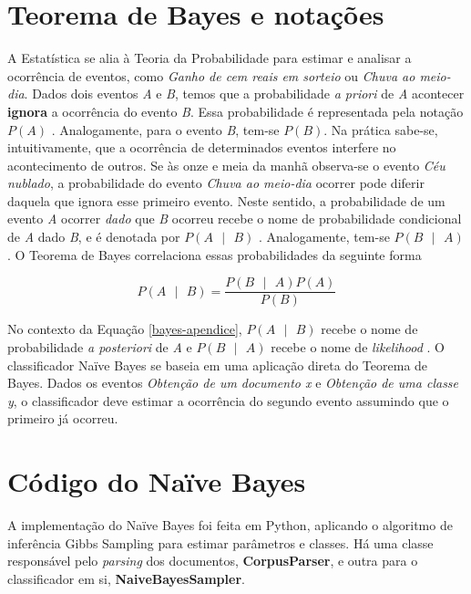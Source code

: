 \appendix

\chapter{Teorema de Bayes e notações}

A Estatística se alia à Teoria da Probabilidade para estimar e analisar a ocorrência de eventos, como \emph{Ganho de cem reais em sorteio} ou \emph{Chuva ao meio-dia}. Dados dois eventos \emph{A} e \emph{B}, temos que a probabilidade \emph{a priori} de \emph{A} acontecer \textbf{ignora} a ocorrência do evento \emph{B}. Essa probabilidade é representada pela notação \ensuremath{P(A)} \cite{spiegelhalter}. Analogamente, para o evento \emph{B}, tem-se \ensuremath{P(B)}. Na prática sabe-se, intuitivamente, que a ocorrência de determinados eventos interfere no acontecimento de outros. Se às onze e meia da manhã observa-se o evento \emph{Céu nublado}, a probabilidade do evento \emph{Chuva ao meio-dia} ocorrer pode diferir daquela que ignora esse primeiro evento. Neste sentido, a probabilidade de um evento \emph{A} ocorrer \emph{dado} que \emph{B} ocorreu recebe o nome de probabilidade condicional de \emph{A} dado \emph{B}, e é denotada por \ensuremath{P(A\mbox{ }|\mbox{ }B)} \cite{spiegelhalter}. Analogamente, tem-se \ensuremath{P(B\mbox{ }|\mbox{ }A)}. O Teorema de Bayes correlaciona essas probabilidades da seguinte forma \cite{spiegelhalter}

\begin{equation}
\label{bayes-apendice}
\ensuremath{P(A\mbox{ }|\mbox{ }B) = \frac{P(B\mbox{ }|\mbox{ }A)P(A)}{P(B)}} 
\end{equation}

No contexto da Equação \ref{bayes-apendice}, \ensuremath{P(A\mbox{ }|\mbox{ }B)} recebe o nome de probabilidade \emph{a posteriori} de \emph{A} e \ensuremath{P(B\mbox{ }|\mbox{ }A)} recebe o nome de \emph{likelihood} \cite{spiegelhalter}. O classificador Naïve Bayes se baseia em uma aplicação direta do Teorema de Bayes.  Dados os eventos \emph{Obtenção de um documento x} e \emph{Obtenção de uma classe y}, o classificador deve estimar a ocorrência do segundo evento assumindo que o primeiro já ocorreu.   

\chapter{Código do Naïve Bayes}

A implementação do Naïve Bayes foi feita em Python, aplicando o algoritmo de inferência Gibbs Sampling para estimar parâmetros e classes. Há uma classe responsável pelo \emph{parsing} dos documentos, \textbf{CorpusParser}, e outra para o classificador em si, \textbf{NaiveBayesSampler}.

